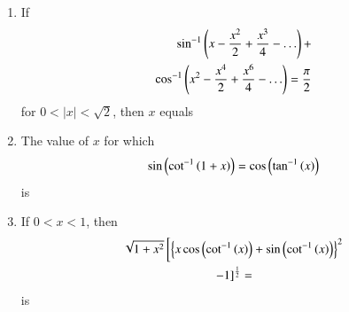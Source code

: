 \documentclass[journal,12pt,twocolumn,article]{IEEEtran}
\theoremstyle{remark}
\begin{document}
\begin{enumerate}
\begin{enumerate}
\end{enumerate}
\item If
\begin{align*}
\sin ^{-1}\left(x-\frac{x^2}{2}+\frac{x^3}{4}-\ldots\right)+ \\\cos ^{-1}\left(x^2-\frac{x^4}{2}+\frac{x^6}{4}-\ldots\right)=\frac{\pi}{2}
\end{align*}
for $0<|x|<\sqrt{2}$, then $x$ equals 
\hfill {}
\begin{enumerate}
\end{enumerate}
\item The value of $x$ for which 
\begin{align*}
\sin\left(\cot^{-1}\left(1+x\right)\right)=\cos \left(\tan ^{-1}\left(x\right)\right)
\end{align*}
is 
\hfill {}
\begin{enumerate}
\end{enumerate}
\item  If $0<x<1$, then 
\begin{multline*}
\sqrt{1+x^2}{}\left[\left\{ x\cos \left(\cot ^{-1}\left(x\right)\right)+ \sin \left(\cot ^{-1}\left(x\right)\right)\right\}^2 \right.\\
\left. - 1\right]^{\frac{1}{2}}=
\end{multline*}
is
\hfill {}
\begin{enumerate}
\begin{multicols}{2}

\end{multicols}
\end{enumerate}
\end{enumerate}
\end{document}
